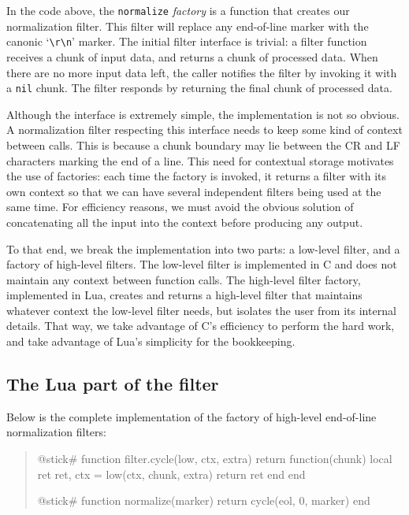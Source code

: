 \documentclass[10pt]{article}
\begin{document}
In the code above, the \texttt{normalize} \emph{factory} is a
function that creates our normalization filter. This filter
will replace any end-of-line marker with the canonic
`\verb|\r\n|' marker. The initial filter interface is
trivial: a filter function receives a chunk of input data,
and returns a chunk of processed data.  When there are no
more input data left, the caller notifies the filter by invoking
it with a \texttt{nil} chunk. The filter responds by returning
the final chunk of processed data.

Although the interface is extremely simple, the
implementation is not so obvious. A normalization filter
respecting this interface needs to keep some kind of context
between calls. This is because a chunk boundary may lie between 
the CR and LF characters marking the end of a line. This
need for contextual storage motivates the use of
factories: each time the factory is invoked, it returns a
filter with its own context so that we can have several
independent filters being used at the same time.  For
efficiency reasons, we must avoid the obvious solution of 
concatenating all the input into the context before
producing any output. 

To that end, we break the implementation into two parts:
a low-level filter, and a factory of high-level filters. The
low-level filter is implemented in C and does not maintain
any context between function calls. The high-level filter
factory, implemented in Lua, creates and returns a
high-level filter that maintains whatever context the low-level
filter needs, but isolates the user from its internal
details. That way, we take advantage of C's efficiency to
perform the hard work, and take advantage of Lua's
simplicity for the bookkeeping.

\subsection{The Lua part of the filter}

Below is the complete implementation of the factory of high-level
end-of-line normalization filters:
\begin{quote}
\begin{lua}
@stick#
function filter.cycle(low, ctx, extra)
  return function(chunk)
    local ret
    ret, ctx = low(ctx, chunk, extra)
    return ret
  end
end
%

@stick#
function normalize(marker)
  return cycle(eol, 0, marker)
end
%
\end{lua}
\end{quote}
\end{document}
